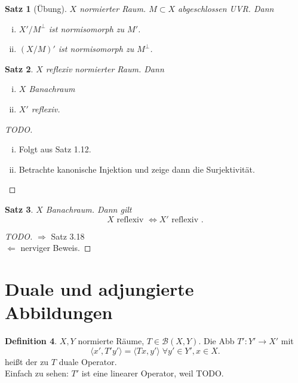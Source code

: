 \documentclass[ngerman]{report}
\theoremstyle{plain}%
\newtheorem{thm}{Satz}[chapter]
\theoremstyle{definition}%
\newtheorem{definition}[thm]{Definition}
\theoremstyle{myStyle}
\newcommand{\BS}[1][X,Y]{\mathcal{B}(#1)} %
\newcommand{\df}[1][]{%
	\overset{#1}{\Rightarrow}
}
\newcommand{\aq}{\Leftrightarrow} %
\newcommand{\fop}[1]{\langle #1 \rangle}
\begin{document}
	\begin{thm}[Übung]
		$X$ normierter Raum. $M \subset X$ abgeschlossen UVR. Dann 
					\begin{enumerate}[(i)]
						\item $X' / M^\perp$ ist normisomorph zu $M'$.
						\item $(X / M)'$ ist normisomorph zu $M^\perp$.
					\end{enumerate}
	\end{thm}

	\begin{thm}
		$X$ reflexiv normierter Raum. Dann
					\begin{enumerate}[(i)]
						\item $X$ Banachraum
						\item $X'$ reflexiv.
					\end{enumerate}

	\end{thm}

	\begin{proof}[TODO]
		\begin{enumerate}[(i)]
			\item Folgt aus Satz 1.12.
			\item Betrachte kanonische Injektion und zeige dann die Surjektivität.
		\end{enumerate}
\end{proof}

	\begin{thm}
		$X$ Banachraum. Dann gilt 
			$$ X \text{ reflexiv } \aq X' \text{ reflexiv }.$$
	\end{thm}

	\begin{proof}[TODO]
	$\df$ Satz 3.18\\
	$\Leftarrow$ nerviger Beweis.
	\end{proof}

	\section{Duale und adjungierte Abbildungen}

	\begin{definition}
	$X,Y$ normierte Räume, $T\in \BS$. Die Abb $T' : Y' \to X'$ mit 
		$$\fop{x',T' y'} = \fop{Tx, y'} \; \forall y'\in Y', x \in X.$$
		heißt der zu $T$ duale Operator.\\
		Einfach zu sehen: $T'$ ist eine linearer Operator, weil TODO.
	\end{definition}
\end{document}

